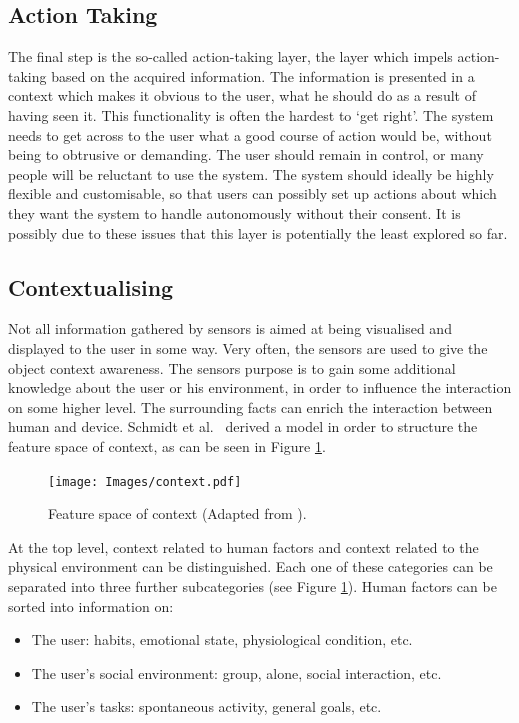 \subsection{Action Taking}
\label{actionTaking}
The final step is the so-called action-taking layer, the layer which impels action-taking based on the acquired information. 
The information is presented in a context which makes it obvious to the user, what he should do as a result of having seen it.
This functionality is often the hardest to `get right'. 
The system needs to get across to the user what a good course of action would be, without being to obtrusive or demanding. 
The user should remain in control, or many people will be reluctant to use the system. The system should ideally be highly flexible and customisable, so that users can possibly set up actions about which they want the system to handle autonomously without their consent. It is possibly due to these issues that this layer is potentially the least explored so far.

\subsection{Contextualising}
Not all information gathered by sensors is aimed at being visualised and displayed to the user in some way. 
Very often, the sensors are used to give the object context awareness.
The sensors purpose is to gain some additional knowledge about the user or his environment, in order to influence the interaction on some higher level. 
The surrounding facts can enrich the interaction between human and device. 
Schmidt et al.\ \cite{schmidt99} derived a model in order to structure the feature space of context, as can be seen in Figure \ref{fig:context}.

\begin{figure}[!t]
	\centering
	\texttt{[image: Images/context.pdf]}
	\caption{Feature space of context (Adapted from \cite{schmidt99}).}
	\label{fig:context}
\end{figure}

At the top level, context related to human factors and context related to the physical environment can be distinguished. Each one of these categories can be separated into three further subcategories (see Figure \ref{fig:context}). Human factors can be sorted into information on:

\begin{itemize}
	\item The user: habits, emotional state, physiological condition, etc.
	\item The user's social environment: group, alone, social interaction, etc.
	\item The user's tasks: spontaneous activity, general goals, etc.
\end{itemize}

